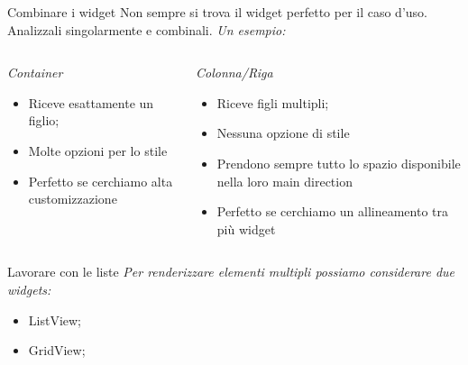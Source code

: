\documentclass{../libs/presentation_format}
\begin{document}

\begin{frame}{Combinare i widget}
	\centering
	Non sempre si trova il widget perfetto per il caso d'uso. Analizzali singolarmente e combinali.
	\newline
	\emph{Un esempio:}
	\newline
	\begin{minipage}[0.2\textheight]{\textwidth}
		\begin{columns}[T]
			\begin{column}{0.5\textwidth}
				\emph{Container}
				\begin{itemize}
					\item Riceve esattamente un figlio;
					\item Molte opzioni per lo stile
					\item Perfetto se cerchiamo alta customizzazione
				\end{itemize}
			\end{column}
			\begin{column}{0.5\textwidth}
				\emph{Colonna/Riga}
				\begin{itemize}
					\item Riceve figli multipli;
					\item Nessuna opzione di stile
					\item Prendono sempre tutto lo spazio disponibile nella loro main direction
					\item Perfetto se cerchiamo un allineamento tra più widget
				\end{itemize}
			\end{column}
		\end{columns}
	\end{minipage}
\end{frame}


\begin{frame}{Lavorare con le liste}
	\emph{Per renderizzare elementi multipli possiamo considerare due widgets:}
	\begin{itemize}
		\item ListView;
		\item GridView;
	\end{itemize}
\end{frame}

\end{document}
